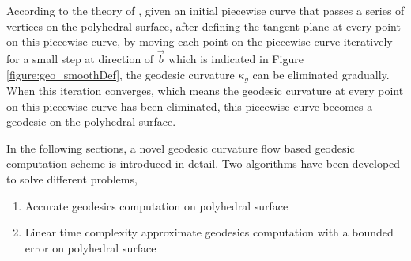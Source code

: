 According to the theory of , given an initial piecewise curve that passes a series of vertices on the polyhedral surface, after defining the tangent plane at every point on this piecewise curve, by moving each point on the piecewise curve iteratively for a small step at direction of $\vec{b}$ which is indicated in Figure \ref{figure:geo_smoothDef}, the geodesic curvature $\kappa_{g}$ can be eliminated gradually. When this iteration converges, which means the geodesic curvature at every point on this piecewise curve has been eliminated, this piecewise curve becomes a geodesic on the polyhedral surface. 

In the following sections, a novel geodesic curvature flow based geodesic computation scheme is introduced in detail. Two algorithms have been developed to solve different problems,

\begin{enumerate}
  \item Accurate geodesics computation on polyhedral surface
  \item Linear time complexity approximate geodesics computation with a bounded error on polyhedral surface
\end{enumerate}


%
%
%
%  
  
